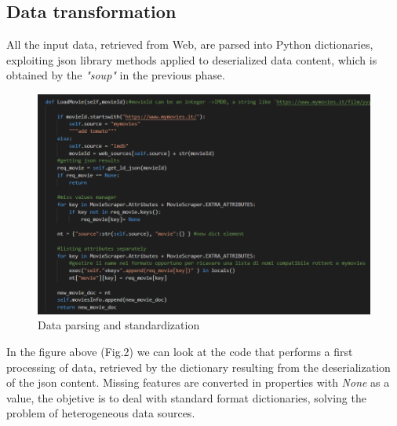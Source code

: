 \documentclass[11pt]{article}
\begin{document}
\subsection{Data transformation}
All the input data, retrieved from Web, are parsed into Python dictionaries, exploiting json library methods applied to deserialized data content, which is obtained by the \emph{"soup"} in the previous phase.

\begin{figure}[H]
    \centering
        \includegraphics[width=1.0\textwidth]{figures/codepic/f2.png}
    \caption{Data parsing and standardization}
    \label{fig:1}
\end{figure}
\noindent In the figure above (Fig.2) we can look at the code that performs a first processing of data, retrieved by the dictionary resulting from the deserialization of the json content. Missing features are converted in properties with \emph{None} as a value, the objetive is to deal with standard format dictionaries, solving the problem of heterogeneous data sources.\newpage
\end{document}
